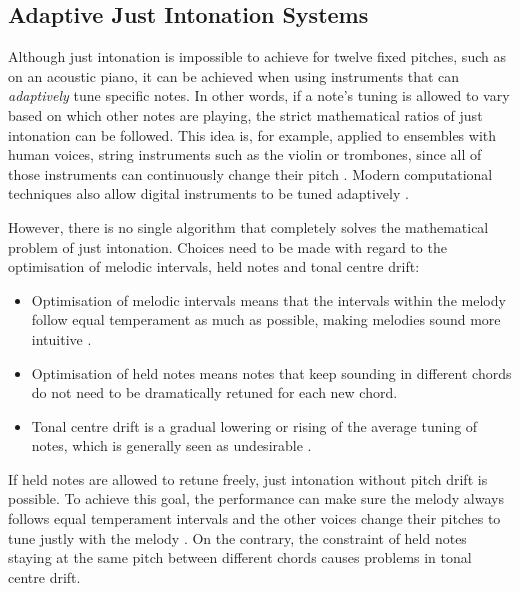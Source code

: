 \documentclass[a4paper]{article}
\begin{document}
\subsection{Adaptive Just Intonation Systems}
\label{intro_adaptive_ji}
Although just intonation is impossible to achieve for twelve fixed pitches, such as on an acoustic piano, it can be achieved when using instruments that can \textit{adaptively} tune specific notes. In other words, if a note's tuning is allowed to vary based on which other notes are playing, the strict mathematical ratios of just intonation can be followed. This idea is, for example, applied to ensembles with human voices, string instruments such as the violin or trombones, since all of those instruments can continuously change their pitch \cite{van_de_craats_fis_1989}. Modern computational techniques also allow digital instruments to be tuned adaptively \cite{sethares_adaptive_2005}.

However, there is no single algorithm that completely solves the mathematical problem of just intonation. Choices need to be made with regard to the optimisation of melodic intervals, held notes and tonal centre drift:
\begin{itemize}
	\item Optimisation of melodic intervals means that the intervals within the melody follow equal temperament as much as possible, making melodies sound more intuitive \cite{dougherty_choral_2004}.
	\item Optimisation of held notes means notes that keep sounding in different chords do not need to be dramatically retuned for each new chord.
	\item Tonal centre drift is a gradual lowering or rising of the average tuning of notes, which is generally seen as undesirable \cite{barbershop_harmony_society_contest_2022}.
\end{itemize}
If held notes are allowed to retune freely, just intonation without pitch drift is possible. To achieve this goal, the performance can make sure the melody always follows equal temperament intervals and the other voices change their pitches to tune justly with the melody \cite{dougherty_choral_2004}. On the contrary, the constraint of held notes staying at the same pitch between different chords causes problems in tonal centre drift.
\end{document}
